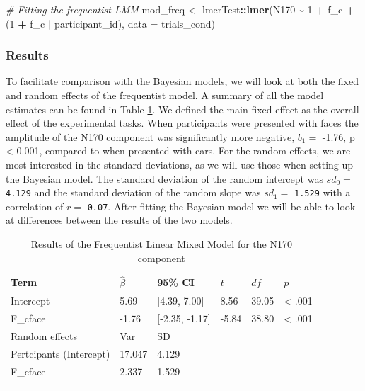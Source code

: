 \documentclass[
  doc,12pt,floatsintext]{apa7}
\newenvironment{Shaded}{\begin{snugshade}}{\end{snugshade}}
\newcommand{\AttributeTok}[1]{\textcolor[rgb]{0.13,0.29,0.53}{#1}}
\newcommand{\CommentTok}[1]{\textcolor[rgb]{0.56,0.35,0.01}{\textit{#1}}}
\newcommand{\DecValTok}[1]{\textcolor[rgb]{0.00,0.00,0.81}{#1}}
\newcommand{\FunctionTok}[1]{\textcolor[rgb]{0.13,0.29,0.53}{\textbf{#1}}}
\newcommand{\NormalTok}[1]{#1}
\newcommand{\OtherTok}[1]{\textcolor[rgb]{0.56,0.35,0.01}{#1}}
\newcommand{\SpecialCharTok}[1]{\textcolor[rgb]{0.81,0.36,0.00}{\textbf{#1}}}
\begin{document}
\begin{Shaded}
\begin{Highlighting}[]
\CommentTok{\# Fitting the frequentist LMM}
\NormalTok{mod\_freq }\OtherTok{\textless{}{-}}\NormalTok{ lmerTest}\SpecialCharTok{::}\FunctionTok{lmer}\NormalTok{(N170 }\SpecialCharTok{\textasciitilde{}} \DecValTok{1} \SpecialCharTok{+}\NormalTok{ f\_c }\SpecialCharTok{+}\NormalTok{ (}\DecValTok{1} \SpecialCharTok{+}\NormalTok{ f\_c }\SpecialCharTok{|}\NormalTok{ participant\_id), }
                           \AttributeTok{data =}\NormalTok{ trials\_cond)}
\end{Highlighting}
\end{Shaded}

\subsubsection{Results}\label{results}

To facilitate comparison with the Bayesian models, we will look at both the fixed and random effects of the frequentist model. A summary of all the model estimates can be found in Table \ref{tab:fLMM-table}. We defined the main fixed effect as the overall effect of the experimental tasks. When participants were presented with faces the amplitude of the N170 component was significantly more negative, \(b_1 =\) -1.76, p \textless{} 0.001, compared to when presented with cars. For the random effects, we are most interested in the standard deviations, as we will use those when setting up the Bayesian model. The standard deviation of the random intercept was \(sd_0 =\) \texttt{4.129} and the standard deviation of the random slope was \(sd_1 =\) \texttt{1.529} with a correlation of \(r =\) \texttt{0.07}. After fitting the Bayesian model we will be able to look at differences between the results of the two models.

\begin{table}[tbp]

\begin{center}
\begin{threeparttable}

\caption{\label{tab:fLMM-table}Results of the Frequentist Linear Mixed Model for the N170 component}

\begin{tabular}{llllll}
\toprule
Term & $\hat{\beta}$ & 95\% CI & $t$ & $\mathit{df}$ & $p$\\
\midrule
Intercept & 5.69 & {}[4.39, 7.00] & 8.56 & 39.05 & < .001\\
F\_cface & -1.76 & {}[-2.35, -1.17] & -5.84 & 38.80 & < .001\\
Random effects & Var & SD & & & \\
Pertcipants (Intercept) & 17.047 & 4.129 & & & \\
F\_cface & 2.337 & 1.529 & & & \\
\bottomrule
\addlinespace
\end{tabular}

\end{threeparttable}
\end{center}

\end{table}
\end{document}
